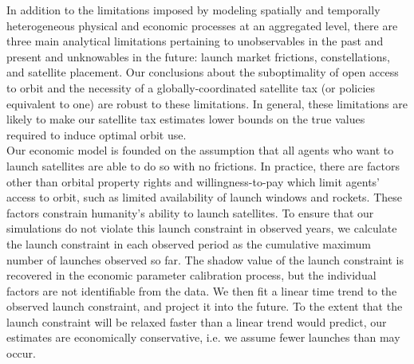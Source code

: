 \documentclass[12pt]{article}
\begin{document}
In addition to the limitations imposed by modeling spatially and temporally heterogeneous physical and economic processes at an aggregated level, there are three main analytical limitations pertaining to unobservables in the past and present and unknowables in the future: launch market frictions, constellations, and satellite placement.  Our conclusions about the suboptimality of open access to orbit and the necessity of a globally-coordinated satellite tax (or policies equivalent to one) are robust to these limitations. In general, these limitations are likely to make our satellite tax estimates lower bounds on the true values required to induce optimal orbit use. \\

Our economic model is founded on the assumption that all agents who want to launch satellites are able to do so with no frictions. In practice, there are factors other than orbital property rights and willingness-to-pay which limit agents' access to orbit, such as limited availability of launch windows and rockets. These factors constrain humanity's ability to launch satellites. To ensure that our simulations do not violate this launch constraint in observed years, we calculate the launch constraint in each observed period as the cumulative maximum number of launches observed so far. The shadow value of the launch constraint is recovered in the economic parameter calibration process, but the individual factors are not identifiable from the data. We then fit a linear time trend to the observed launch constraint, and project it into the future. To the extent that the launch constraint will be relaxed faster than a linear trend would predict, our estimates are economically conservative, i.e. we assume fewer launches than may occur. \\
\end{document}
